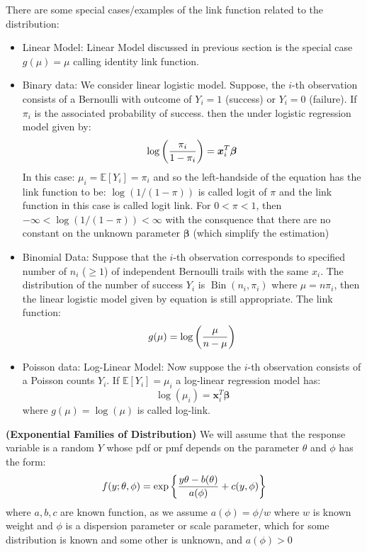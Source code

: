\begin{remark}
    There are some special cases/examples of the link function related to the distribution:
    \begin{itemize}
        \item Linear Model: Linear Model discussed in previous section is the special case $g(\mu) = \mu$ calling identity link function. 
        \item Binary data: We consider linear logistic model. Suppose, the $i$-th observation consists of a Bernoulli with outcome of $Y_i=1$ (success) or $Y_i=0$ (failure). If $\pi_i$ is the associated probability of success. then the under logistic regression model given by:
        \begin{equation*}
            \log \left( \frac{\pi_i}{1-\pi_i} \right) = \boldsymbol x_i^T\boldsymbol \beta
        \end{equation*}
        In this case: $\mu_i = \mathbb{E}[Y_i] = \pi_i$ and so the left-handside of the equation has the link function to be: $\log(1/(1-\pi))$ is called logit of $\pi$ and the link function in this case is called logit link. For $0 < \pi < 1$, then $-\infty < \log(1/(1-\pi)) < \infty$ with the consquence that there are no constant on the unknown parameter $\boldsymbol \beta$ (which simplify the estimation) 
        \item Binomial Data: Suppose that the $i$-th observation corresponds to specified number of $n_i$ ($\ge1$) of independent Bernoulli trails with the same $x_i$. The distribution of the number of success $Y_i$ is $\operatorname{Bin}(n_i, \pi_i)$ where $\mu = n\pi_i$, then the linear logistic model given by equation is still appropriate. The link function:
        \begin{equation*}
            g(\mu) = \log\left( \frac{\mu}{n-\mu} \right)
        \end{equation*}
        \item Poisson data: Log-Linear Model: Now suppose the $i$-th observation consists of a Poisson counts $Y_i$. If $\mathbb{E}[Y_i] = \mu_i$ a log-linear regression model has:
        \begin{equation*}
            \log(\mu_i) = \boldsymbol x_i^T\boldsymbol \beta
        \end{equation*}
        where $g(\mu) = \log(\mu)$ is called log-link.
    \end{itemize}
\end{remark}

\begin{remark}{\textbf{(Exponential Families of Distribution)}}
    We will assume that the response variable is a random $Y$ whose pdf or pmf depends on the parameter $\theta$ and $\phi$ has the form:
    \begin{equation*}
        f(y;\theta,\phi) = \exp\left\{ \frac{y\theta - b(\theta)}{a(\phi)} + c(y, \phi) \right\}
    \end{equation*}
    where $a, b, c$ are known function, as we assume $a(\phi) = \phi/w$ where $w$ is known weight and $\phi$ is a dispersion parameter or scale parameter, which for some distribution is known and some other is unknown, and $a(\phi)>0$
\end{remark}

